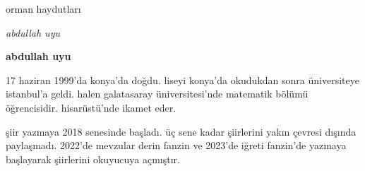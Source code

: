 \documentclass[10pt, openright, twoside]{memoir}
\theoremstyle{definition}
\begin{document}
\thispagestyle{empty}
\begin{flushright}
  \fontsize{0.8in}{0cm}\selectfont{}orman haydutları
\end{flushright}
\begin{flushright}
  \textit{abdullah uyu}
\end{flushright}
\vfill
\begin{figure}[H]
  \centering
\end{figure}
\newpage
\textbf{abdullah uyu}

17 haziran 1999'da konya'da doğdu. liseyi
konya'da okudukdan sonra üniversiteye
istanbul'a geldi. halen galatasaray
üniversitesi'nde matematik bölümü
öğrencisidir. hisarüstü'nde ikamet eder.

şiir yazmaya 2018 senesinde başladı. üç
sene kadar şiirlerini yakın çevresi dışında
paylaşmadı. 2022'de mevzular derin fanzin
ve 2023'de iğreti fanzin'de yazmaya
başlayarak şiirlerini okuyucuya açmıştır.
\newpage
\tableofcontents
\end{document}
